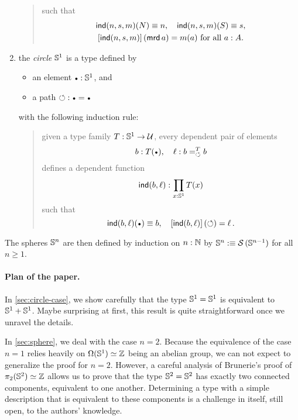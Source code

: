 \documentclass[english,a4]{article}
\renewcommand{\ap}[1]{\left[{#1}\right]}
\begin{document}
\begin{enumerate}
\begin{quote}
\begin{displaymath}
    \end{displaymath}
    such that
    \begin{gather*}
      \ind(n,s,m)(N) \jdeq n,\quad \ind(n,s,m)(S) \jdeq s,\\
      \ap{\ind(n,s,m)}(\mrd a) = m(a)\ \text{for all}\ a\from A.
    \end{gather*}
  \end{quote}
\item the {\em circle} ${{\mathbb S^{1}}}$ is a type defined by
  \begin{itemize}
  \item an element $\base \from \Sc$, and
  \item a path $\Sloop: \base = \base$
  \end{itemize}
  with the following induction rule:
  \begin{quote}
    given a type family $T: {{\mathbb S^{1}}} \to \mathcal{U}$, every dependent pair of
    elements
    \begin{displaymath}
      b\from T(\base), \quad \ell\from \pathover b T \Sloop b
    \end{displaymath}
    defines a dependent function
    \begin{displaymath}
      \operatorname{\mathsf{ind}}(b,\ell):\prod_{x: {{\mathbb S^{1}}}} T(x)
    \end{displaymath}
    such that
    \begin{displaymath}
      \ind(b,\ell)(\base) \jdeq b,\quad \ap{\ind(b,\ell)}(\Sloop) = \ell \,.
    \end{displaymath}
  \end{quote}
\end{enumerate}
The spheres ${\mathbb S^{n}}$ are then defined by induction on $n:\mathbb{N}$ by
${\mathbb S^{n}} \mathrel{\hbox{:}\mkern-5mu\equiv} \operatorname{\mathcal S} {({\mathbb S^{n-1}})}$ for all $n\geq 1$.


\paragraph{Plan of the paper.}%
In \cref{sec:circle-case}, we show carefully that the type ${{\mathbb S^{1}}} = {{\mathbb S^{1}}}$
is equivalent to ${{\mathbb S^{1}}} + {{\mathbb S^{1}}}$. Maybe surprising at first, this result
is quite straightforward once we unravel the details.

In \cref{sec:sphere}, we deal with the case $n=2$. Because the
equivalence of the case $n=1$ relies heavily on $\Omega({{\mathbb S^{1}}})\simeq \mathbb{Z}$
being an abelian group, we can not expect to generalize the proof for
$n=2$. However, a careful analysis of Brunerie's proof of
$\pi_2({{\mathbb S^{2}}}) \simeq \mathbb{Z}$ allows us to prove that the type ${{\mathbb S^{2}}}={{\mathbb S^{2}}}$ has
exactly two connected components, equivalent to one another. 
Determining a type with a simple description that is
equivalent to these components is a challenge in itself, still open,
to the authors' knowledge.
\end{document}
